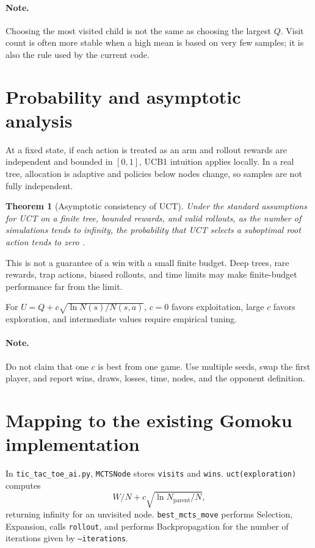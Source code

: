 \documentclass[conference]{IEEEtran}
\newtheorem{theorem}[definition]{Theorem}
\begin{document}
\paragraph{Note.} Choosing the most visited child is not the same as choosing the
largest $Q$. Visit count is often more stable when a high mean is based on very few
samples; it is also the rule used by the current code.

\section{Probability and asymptotic analysis}
At a fixed state, if each action is treated as an arm and rollout rewards are
independent and bounded in $[0,1]$, UCB1 intuition applies locally. In a real tree,
allocation is adaptive and policies below nodes change, so samples are not fully
independent.

\begin{theorem}[Asymptotic consistency of UCT]
Under the standard assumptions for UCT on a finite tree, bounded rewards, and valid
rollouts, as the number of simulations tends to infinity, the probability that UCT
selects a suboptimal root action tends to zero \cite{kocsis2006}.
\end{theorem}

This is not a guarantee of a win with a small finite budget. Deep trees, rare
rewards, trap actions, biased rollouts, and time limits may make finite-budget
performance far from the limit.

For $U=Q+c\sqrt{\ln N(s)/N(s,a)}$, $c=0$ favors exploitation, large $c$ favors
exploration, and intermediate values require empirical tuning.

\paragraph{Note.} Do not claim that one $c$ is best from one game. Use multiple
seeds, swap the first player, and report wins, draws, losses, time, nodes, and the
opponent definition.

\section{Mapping to the existing Gomoku implementation}
In \texttt{tic\_tac\_toe\_ai.py}, \texttt{MCTSNode} stores \texttt{visits} and
\texttt{wins}. \texttt{uct(exploration)} computes
\[
W/N+c\sqrt{\ln N_{\mathrm{parent}}/N},
\]
returning infinity for an unvisited node. \texttt{best\_mcts\_move} performs
Selection, Expansion, calls \texttt{rollout}, and performs Backpropagation for
the number of iterations given by \texttt{--iterations}.
\end{document}
